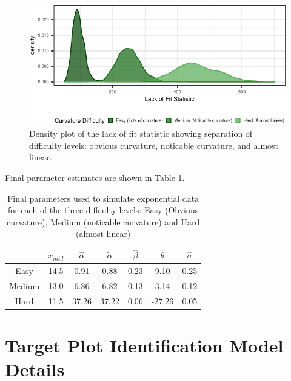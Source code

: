 \begin{appendix}
\begin{figure}

{\centering \includegraphics[width=\columnwidth]{./images/lof-density-curves-1} 

}

\caption{Density plot of the lack of fit statistic showing separation of difficulty levels: obvious curvature, noticable curvature, and almost linear.}\label{fig:lof-density-curves}
\end{figure}

Final parameter estimates are shown in Table \ref{tab:parameter-data}.

\begin{table}

\caption{\label{tab:parameter-data}Final parameters used to simulate exponential data for each of the three diffculty levels: Easy (Obvious curvature), Medium (noticable curvature) and Hard (almost linear)}
\centering
\begin{tabular}[t]{ccccccc}
\toprule
 & $x_{mid}$ & $\hat\alpha$ & $\tilde\alpha$ & $\hat\beta$ & $\hat\theta$ & $\hat\sigma$\\
\midrule
Easy & 14.5 & 0.91 & 0.88 & 0.23 & 9.10 & 0.25\\
Medium & 13.0 & 6.86 & 6.82 & 0.13 & 3.14 & 0.12\\
Hard & 11.5 & 37.26 & 37.22 & 0.06 & -27.26 & 0.05\\
\bottomrule
\end{tabular}
\end{table}

\hypertarget{target-plot-identification-model-details}{%
\section{\texorpdfstring{Target Plot Identification Model Details
\label{app:glmm-model}}{Target Plot Identification Model Details }}\label{target-plot-identification-model-details}}


\end{appendix}
